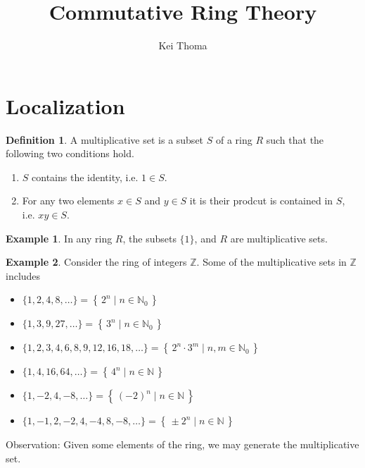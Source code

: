 \documentclass[a4paper]{book}
\title{Commutative Ring Theory}
\author{Kei Thoma}
\theoremstyle{definition}
\newtheorem{definition}{Definition}[]
\newtheorem{example}{Example}[definition]
\newcommand{\makeset}[2]{\left\{\, #1 \mid #2 \,\right\}}
\begin{document}
\section{Localization}
\begin{defbox}
    \begin{definition}
        A multiplicative set is a subset \(S\) of a ring \(R\) such that the following two conditions hold.
        \begin{enumerate}
            \item \(S\) contains the identity, i.e. \(1 \in S\).
            \item For any two elements \(x \in S\) and \(y \in S\) it is their prodcut is contained in \(S\), i.e. \(xy \in S\).
        \end{enumerate}
    \end{definition}
\end{defbox}

\begin{exmbox}
    \begin{example}
        In any ring \(R\), the subsets \(\{1\}\), and \(R\) are multiplicative sets.
    \end{example}
\end{exmbox}

\begin{example}
    Consider the ring of integers \(\mathbb{Z}\). Some of the multiplicative sets in \(\mathbb{Z}\) includes
    \begin{itemize}
        \item \(\{1, 2, 4, 8, \ldots\} = \makeset{2^n}{n \in \mathbb{N}_0}\)
        \item \(\{1, 3, 9, 27, \ldots\} = \makeset{3^n}{n \in \mathbb{N}_0}\)
        \item \(\{1, 2, 3, 4, 6, 8, 9, 12, 16, 18, \ldots\} = \makeset{2^n \cdot 3^m}{n, m \in \mathbb{N}_0}\)
        \item \(\{1, 4, 16, 64, \ldots\} = \makeset{4^n}{n \in \mathbb{N}}\)
        \item \(\{1, -2, 4, -8, \ldots\} = \makeset{(-2)^n}{n \in \mathbb{N}}\)
        \item \(\{1, -1, 2, -2, 4, -4, 8, -8, \ldots\} = \makeset{\pm 2^n}{n \in \mathbb{N}}\)
    \end{itemize}
\end{example}

Observation: Given some elements of the ring, we may generate the multiplicative set.
\end{document}
